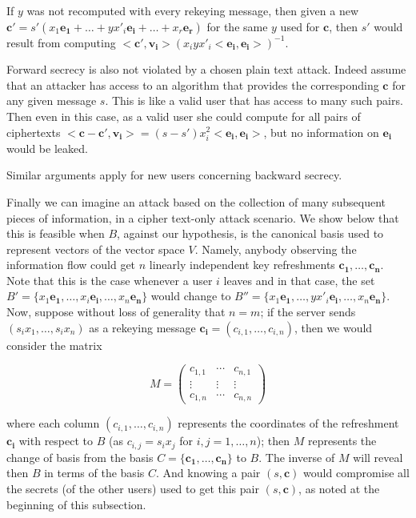 \documentclass[a4paper,11pt]{amsart}
\theoremstyle{definition}
\begin{document}
If $y$ was not recomputed with every rekeying message, then given a
new $\mathbf{c'} = s'(x_1\mathbf{e_1}+ \dots + yx'_i\mathbf{e_i} +
\dots + x_r\mathbf{e_r})$ for the same $y$ used for $\mathbf{c}$, then
$s'$ would result from computing
$<\mathbf{c'},\mathbf{v_i}>(x_iyx'_i<\mathbf{e_i},
\mathbf{e_i}>)^{-1}$. 


Forward secrecy is also not violated by a chosen plain text attack. Indeed
assume that an attacker has access to an
algorithm that provides the corresponding $\mathbf{c}$ for any given
message $s$. This is like a valid user that has access to many such
pairs. Then even in this case, as a valid user she could compute for
all pairs of ciphertexts $<\mathbf{c} -\mathbf{c'} ,\mathbf{v_i}
>=(s-s')x_i^2<\mathbf{e_i} ,\mathbf{e_i} >$, but no information on
$\mathbf{ e_i}$ would be leaked. 

Similar arguments apply for new users concerning backward secrecy.


Finally we can imagine an attack based on the collection of many
subsequent pieces of information, in a cipher text-only attack
scenario. We show below that this is feasible when $B$, against our
hypothesis, is the canonical basis used to represent vectors of the
vector space $V$.
Namely, anybody observing the information flow could get $n$ linearly
independent key refreshments $\mathbf{c_1}, \dots ,\mathbf{c_n} $.
Note that this is the case whenever a user $i$ leaves and in that
case, the set $B'=\{ x_1\mathbf{e_1} , \dots ,x_i\mathbf{e_i} , \dots
,x_n\mathbf{e_n} \}$ would change to $B''=\{ x_1\mathbf{e_1} , \dots
,yx'_i\mathbf{e_i} , \dots ,x_n\mathbf{e_n} \}$. Now, suppose without
loss of generality that $n=m$; if the server sends $(s_ix_1,\dots
,s_ix_n)$ as a rekeying message $\mathbf{c_i} =(c_{i,1},\dots
,c_{i,n})$, then we would consider the matrix

$$M=\left( \begin{array}{ccc} c_{1,1} & \cdots & c_{n,1} \\ \vdots &
    \vdots & \vdots \\ c_{1,n} & \cdots & c_{n,n}
  \end{array} \right)$$

\noindent where each column $(c_{i,1},\dots ,c_{i,n})$ represents the
coordinates of the refreshment $\mathbf{c_i} $ with respect to $B$ (as
$c_{i,j}=s_ix_j$ for $i,j=1,\dots ,n$); then $M$ represents the change
of basis from the basis $C=\{ \mathbf{c_1} , \dots ,\mathbf{c_n} \}$
to $B$. The inverse of $M$ will reveal then $B$ in terms of the basis
$C$. And knowing a pair $(s,\mathbf{c} )$ would compromise all the
secrets (of the other users) used to get this pair $(s,\mathbf{c} )$,
as noted at the beginning of this subsection.
\end{document}
